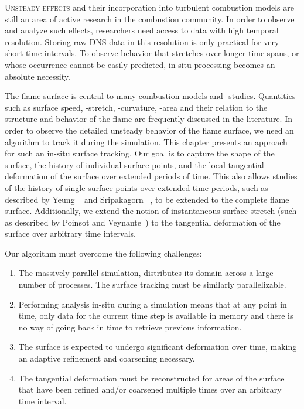 \vspace{-\baselineskip}\lettrine[findent=0.3pt, loversize=-0.015,
lhang=0.04]{U}{nsteady effects} and their incorporation into turbulent
combustion models are still an area of active research in the combustion
community.
%
In order to observe and analyze such effects, researchers need access to data
with high temporal resolution.
%
Storing raw \ac{DNS} data in this resolution is only practical for very short
time intervals.
%
To observe behavior that stretches over longer time spans, or whose occurrence
cannot be easily predicted, in-situ processing becomes an absolute necessity.
%

%
The flame surface is central to many combustion models and -studies.
%
Quantities such as surface speed, -stretch, -curvature, -area and their
relation to the structure and behavior of the flame are frequently discussed in
the literature.
%
In order to observe the detailed unsteady behavior of the flame surface, we need
an algorithm to track it during the simulation.
%
This chapter presents an approach for such an in-situ surface tracking.
%
Our goal is to capture the shape of the surface, the history of individual
surface points, and the local tangential deformation of the surface over
extended periods of time.
%
This also allows studies of the history of single surface points over extended
time periods, such as described by Yeung \etal~\cite{Yeung1990} and Sripakagorn
\etal~\cite{Sripakagorn2004}, to be extended to the complete flame surface.
%
Additionally, we extend the notion of instantaneous surface stretch (such as
described by Poinsot and Veynante~\cite{Poinsot2012}) to the tangential
deformation of the surface over arbitrary time intervals.
%

%
Our algorithm must overcome the following challenges:
%
\begin{enumerate}
    \item \label{it:parallel}
        The massively parallel simulation, distributes its domain across a large
        number of processes. The surface tracking must be similarly
        parallelizable.
    \item \label{it:in-situ}
        Performing analysis in-situ during a simulation means that at any
        point in time, only data for the current time step is available in
        memory and there is no way of going back in time to retrieve previous
        information.
    \item \label{it:refinement}
        The surface is expected to undergo significant deformation over time,
        making an adaptive refinement and coarsening necessary.
    \item \label{it:deformation}
        The tangential deformation must be reconstructed for areas of the
        surface that have been refined and/or coarsened multiple times over an
        arbitrary time interval.
\end{enumerate}
%

